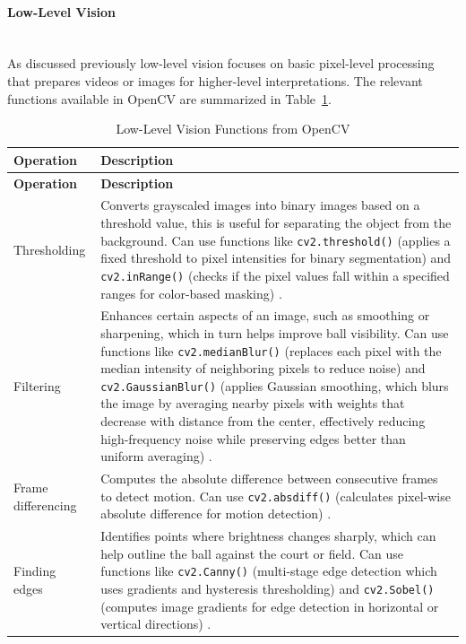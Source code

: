 \documentclass[12pt,a4paper]{article}
\begin{document}
\paragraph{Low-Level Vision}
\mbox{}\\
As discussed previously low-level vision focuses on basic pixel-level processing that prepares videos or images for higher-level interpretations. The relevant functions available in OpenCV are summarized in Table~\ref{tab:lowlevel}.

\setcounter{table}{0}
\begin{longtable}{@{}l p{}@{}}
	\caption{Low-Level Vision Functions from OpenCV}
	\label{tab:lowlevel} \\
	\toprule
	\textbf{Operation} & \textbf{Description} \\
	\midrule
	\endfirsthead
	\toprule
	\textbf{Operation} & \textbf{Description} \\
	\midrule
	\endhead
	Thresholding & Converts grayscaled images into binary images based on a threshold value, this is useful for separating the object from the background. Can use functions like \texttt{cv2.threshold()} (applies a fixed threshold to pixel intensities for binary segmentation) \parencite{opencv_threshold} and \texttt{cv2.inRange()} (checks if the pixel values fall within a specified ranges for color-based masking) \parencite{opencv_inrange}. \\
	
	Filtering & Enhances certain aspects of an image, such as smoothing or sharpening, which in turn helps improve ball visibility. Can use functions like \texttt{cv2.medianBlur()} (replaces each pixel with the median intensity of neighboring pixels to reduce noise) \parencite{opencv_median} and \texttt{cv2.GaussianBlur()} (applies Gaussian smoothing, which blurs the image by averaging nearby pixels with weights that decrease with distance from the center, effectively reducing high-frequency noise while preserving edges better than uniform averaging) \parencite{opencv_gaussian}. \\
	
	Frame differencing & Computes the absolute difference between consecutive frames to detect motion. Can use \texttt{cv2.absdiff()} (calculates pixel-wise absolute difference for motion detection) \parencite{szeliski2010computer}. \\
	
	Finding edges & Identifies points where brightness changes sharply, which can help outline the ball against the court or field. Can use functions like \texttt{cv2.Canny()} (multi-stage edge detection which uses gradients and hysteresis thresholding) \parencite{opencv_canny} and \texttt{cv2.Sobel()} (computes image gradients for edge detection in horizontal or vertical directions) \parencite{opencv_sobel}. \\
	

\end{longtable}
\end{document}
